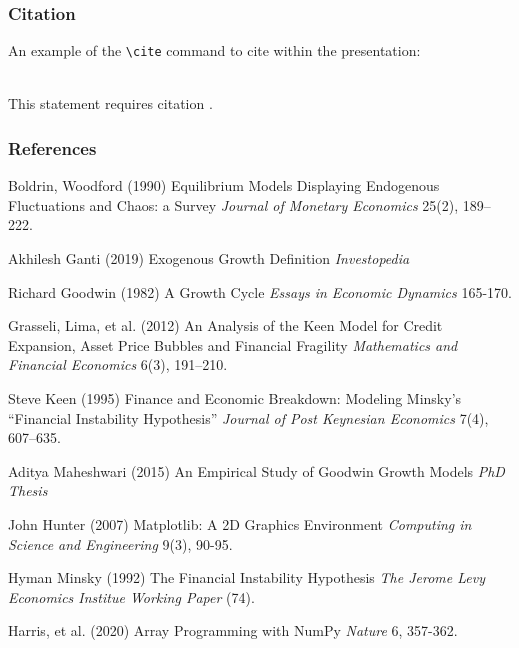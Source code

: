 \documentclass{beamer}
\begin{document}
\begin{frame}[fragile] %
\frametitle{Citation}
An example of the \verb|\cite| command to cite within the presentation:\\~

This statement requires citation \cite{p1}.
\end{frame}

\begin{frame}[allowframebreaks]
\frametitle{References}
\footnotesize{
\begin{thebibliography}{99} %
\begin{tiny}
 Boldrin, Woodford (1990)
\newblock Equilibrium Models Displaying Endogenous Fluctuations and Chaos:  a Survey
\newblock \emph{Journal of Monetary Economics} 25(2), 189–222.

 Akhilesh Ganti (2019)
\newblock Exogenous Growth Definition
\newblock \emph{Investopedia}

 Richard Goodwin (1982)
\newblock A Growth Cycle
\newblock \emph{Essays in Economic Dynamics} 165-170.

 Grasseli, Lima, et al. (2012)
\newblock An Analysis of the Keen Model for Credit Expansion, Asset Price Bubbles and Financial Fragility
\newblock \emph{Mathematics and Financial Economics} 6(3), 191–210.

 Steve Keen (1995)
\newblock Finance and Economic Breakdown:  Modeling Minsky’s “Financial Instability Hypothesis”
\newblock \emph{Journal of Post Keynesian Economics} 7(4), 607–635.

 Aditya Maheshwari (2015)
\newblock An Empirical Study of Goodwin Growth Models
\newblock \emph{PhD Thesis}

 John Hunter (2007)
\newblock Matplotlib: A 2D Graphics Environment
\newblock \emph{Computing in Science and Engineering} 9(3), 90-95.

 Hyman Minsky (1992)
\newblock The Financial Instability Hypothesis
\newblock \emph{The Jerome Levy Economics Institue Working Paper} (74).

 Harris, et al. (2020)
\newblock Array Programming with NumPy
\newblock \emph{Nature} 6, 357-362.


\end{tiny}
\end{thebibliography}}
\end{frame}
\end{document}
